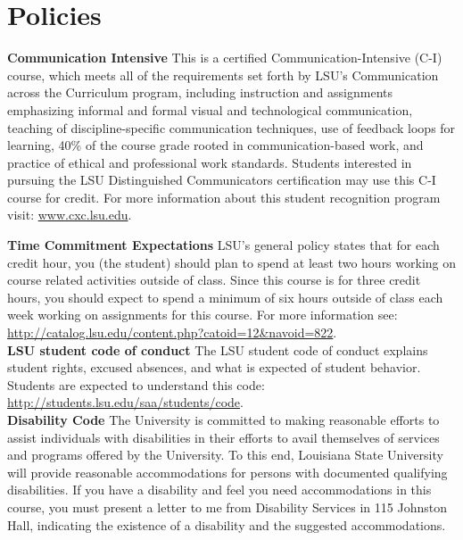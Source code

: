 \documentclass[11pt,article,oneside]{memoir}
\begin{document}

\section{Policies}

\noindent \textbf{Communication Intensive}
This is a certified Communication-Intensive (C-I) course,
which meets all of the requirements set
forth by LSU’s Communication across the Curriculum program, including
 instruction and assignments emphasizing
informal and formal visual and technological communication,
teaching of discipline-specific communication techniques,
use of feedback loops for learning,
40\% of the course grade rooted in communication-based work, and
practice of ethical and professional work standards.
Students interested in pursuing the LSU Distinguished Communicators 
certification may use this C-I course for credit. 
For more information about this student recognition program visit: 
\url{www.cxc.lsu.edu}.\\

\clearpage

\noindent \textbf{Time Commitment Expectations}
LSU's general policy states that for each credit hour, you (the student) should plan to
spend at least two hours working on course related activities outside of class. Since this course is for three credit hours, you should expect to spend a minimum of six hours outside of class each week working on assignments for this course. For more information see: 
\url{http://catalog.lsu.edu/content.php?catoid=12&navoid=822}.\\

\noindent \textbf{LSU student code of conduct}
The LSU student code of conduct explains student rights, excused absences, and what is expected of student behavior. Students are expected to understand this code:  \url{http://students.lsu.edu/saa/students/code}.\\ %

\noindent \textbf{Disability Code}
The University is committed to making reasonable efforts to assist individuals with disabilities in
their efforts to avail themselves of services and programs offered by the University. To this end,
Louisiana State University will provide reasonable accommodations for persons with
documented qualifying disabilities. If you have a disability and feel you need accommodations in
this course, you must present a letter to me from Disability Services in 115 Johnston Hall,
indicating the existence of a disability and the suggested accommodations.\\
\end{document}
